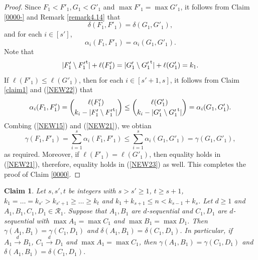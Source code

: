 \documentclass[a4paper,11pt]{article}
\newtheorem{claim}[theorem]{Claim}
\begin{document}
\begin{proof}
 Since $F_1<F'_1, G_1<G'_1$ and $\max F'_1=\max G'_1$, it follows from Claim \ref{0000-} and Remark \ref{remark4.14} that
$$\delta(F_1, F'_1)=\delta(G_1, G'_1),$$ and for each $i\in [s']$,
  \begin{equation}\label{NEW15}
\alpha_i(F_1, F'_1)=\alpha_i(G_1, G'_1).
\end{equation}
Note that
\begin{equation}\label{NEW22}
|F'_1\setminus {F'_1}^{\rm t}|+\ell(F'_1)=|G'_1\setminus {G'_1}^{\rm t}|+\ell(G'_1)=k_1.
\end{equation}
If $\ell(F'_1)\leq \ell(G'_1)$, then for each $i\in [s'+1, s]$, it follows from Claim \ref{claim1} and (\ref{NEW22}) that
\begin{equation}\label{NEW21}
\alpha_i(F_1, F'_1)={\ell(F'_1)\choose k_i-|F'_1\setminus {F'_1}^{\rm t}|}\leq{\ell(G'_1)\choose k_i-|G'_1\setminus {G'_1}^{\rm t}|}=\alpha_i(G_1, G'_1).
\end{equation}
Combing  (\ref{NEW15}) and (\ref{NEW21}), we obtian
\begin{equation}\label{NEW23}
\gamma(F_1, F'_1)=\sum_{i=1}^s\alpha_i(F_1, F'_1)\leq \sum_{i=1}^s\alpha_i(G_1, G'_1)=\gamma(G_1, G'_1),
\end{equation}
as required.
Moreover, if $\ell(F'_1)= \ell(G'_1)$, then %
equality holds in (\ref{NEW21}), therefore, equality holds in (\ref{NEW23}) as well. %
 This completes the proof of  Claim \ref{0000}.
\end{proof}




\begin{claim}\label{equal}
Let $s, s', t$ be integers with $s>s'\geq 1$, $t\geq s+1$, $k_1=\dots=k_{s'}> k_{s'+1}\geq\dots\geq k_t$ and $k_1+k_{s+1}\leq n <k_{s-1}+k_s$.
Let  $d\ge 1$ and $A_1, B_1, C_1, D_1\in \mathcal{R}_1$.
Suppose that $A_1, B_1$ are $d$-sequential and  $C_1, D_1$ are $d$-sequential with $\max A_1=\max C_1$ and $\max B_1=\max D_1$. Then $\gamma(A_1, B_1)=\gamma(C_1, D_1)$ and
$\delta(A_1, B_1)=\delta(C_1, D_1)$.
In particular,
if $A_1\overset{d}{\longrightarrow} B_1$, $C_1\overset{d}{\longrightarrow} D_1$ and $\max A_1=\max C_1$, then $\gamma(A_1, B_1)=\gamma(C_1, D_1)$ and
$\delta(A_1, B_1)=\delta(C_1, D_1)$.
\end{claim}
\end{document}
